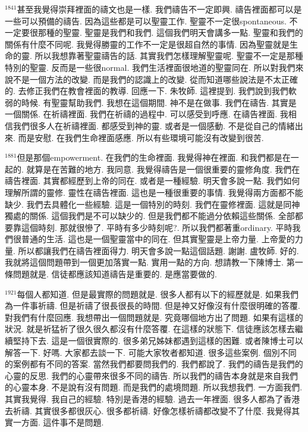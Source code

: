 \documentclass{book}
\begin{document}
$^{1841}$甚至我覺得崇拜裡面的禱文也是一樣.
我們禱告不一定即興.
禱告裡面都可以是一些可以預備的禱告.
因為這些都是可以聖靈工作.
聖靈不一定很spontaneous.
不一定要很那種的聖靈.
聖靈是我們和我們.
這個我們明天會講多一點.
聖靈和我們的關係有什麼不同呢.
我覺得勝靈的工作不一定是很超自然的事情.
因為聖靈就是生命的靈.
所以我想靠著聖靈禱告的話.
其實我們怎樣理解聖靈呢.
聖靈不一定是那種特別的聖靈.
反而是一些很normal.
我們生活裡面很地道的聖靈同在.
所以對我們來說不是一個方法的改變.
而是我們的認識上的改變.
從而知道哪些說法是不太正確的.
去修正我們在教會裡面的教導.
回應一下.
朱牧師.
這裡提到.
我們說到我們軟弱的時候.
有聖靈幫助我們.
我想在這個期間.
神不是在做事.
我們在禱告.
其實是一個關係.
在祈禱裡面.
我們在祈禱的過程中.
可以感受到呼應.
在禱告裡面.
我相信我們很多人在祈禱裡面.
都感受到神的靈.
或者是一個感動.
不是從自己的情緒出來.
而是安慰.
在我們生命裡面感應.
所以有些環境可能沒有改變到很苦.

$^{1881}$但是那個empowerment.
在我們的生命裡面.
我覺得神在裡面.
和我們都是在一起的.
就算是在苦難的地方.
我同意.
我覺得禱告是一個很重要的靈修角度.
我們在禱告裡面.
其實都經歷到上帝的同在.
或者是一種經驗.
明天會多說一點.
我們如何理解所謂的靈修.
靈性在禱告裡面.
這也是一種很重要的事情.
我覺得兩方面都不能缺少.
我們去具體化一些經驗.
這是一個特別的時刻.
我們在靈修裡面.
這就是同神獨處的關係.
這個我們是不可以缺少的.
但是我們都不能過分依賴這些關係.
全部都要靠這個時刻.
那就很慘了.
平時有多少時刻呢?.
所以我們都著重ordinary.
平時我們很普通的生活.
這也是一個聖靈當中的同在.
但其實聖靈是上帝力量.
上帝愛的力量.
所以都讓我們在禱告裡面得力.
明天會多說一點這個話題.
謝謝.
盧牧師.
好的.
我就將這個問題帶到一個更加落實一點.
實用一點的方向.
想請教一下陳博士.
第一條問題就是.
信徒都應該知道禱告是重要的.
是應當要做的.

$^{1921}$每個人都知道.
但是最實際的問題就是.
很多人都有以下的經歷就是.
如果我們為一件事祈禱.
但是祈禱了很長很長的時間.
但是神又好像沒有什麼很明確的答覆.
對我們有什麼回應.
我想帶出一個問題就是.
究竟哪個地方出了問題.
如果有這樣的狀況.
就是祈猛祈了很久很久都沒有什麼答覆.
在這樣的狀態下.
信徒應該怎樣去繼續堅持下去.
這是一個很實際的.
很多弟兄姊妹都遇到這樣的困難.
或者陳博士可以解答一下.
好嗎.
大家都去談一下.
可能大家牧者都知道.
很多這些案例.
個別不同的案例都有不同的答案.
當然我們都要問我們的.
我們都說了.
我們的禱告是我們的心靈的反思.
我們的心靈帶來很多不同的禱告.
所以我們的禱告本身就是來自我們的心靈本身.
不是說有沒有問題.
而是我們的處境問題.
所以我想我們.
一方面我們.
其實我覺得.
我自己的經驗.
特別是香港的經驗.
過去一年裡面.
很多人都為了香港去祈禱.
其實很多都很灰心.
很多都祈禱.
好像怎樣祈禱都改變不了什麼.
我覺得其實一方面.
這件事不是問題.
\end{document}
